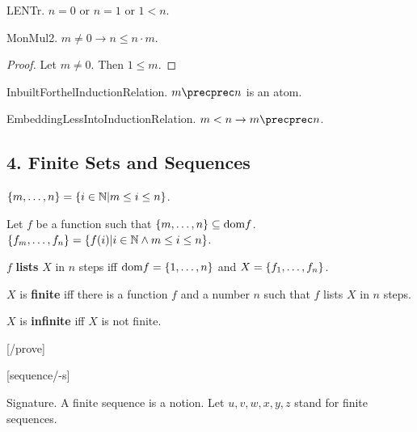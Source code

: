 \begin{axiom} LENTr. 
$n = 0$ or $n = 1$ or $1 < n$.\end{axiom}


\begin{lemma} MonMul2. $m \neq 0 \rightarrow n \leq n \cdot m$.
\end{lemma}
\begin{proof}
Let $m \neq 0$. Then $1 \leq m$.
\end{proof}

\begin{signature} InbuiltForthelInductionRelation. $m \precprec n$ is an atom.
\end{signature}

\begin{axiom} EmbeddingLessIntoInductionRelation. $m < n \rightarrow m \precprec n$. \end{axiom}

\subsection{4. Finite Sets and Sequences}

\begin{definitionp} 
$\{m,\dots,n\} = \{ i \in {\Bbb N} | m \leq i \leq n \}$.
\end{definitionp}

\begin{definitionp} 
Let $f$ be a function such that 
$\{m,\dots,n\} \subseteq \text{dom} f$. 
$\{f_{m},\dots,f_{n}\} = \{ f(i) | i \in {\Bbb N} \wedge m \leq i \leq n \}$.
\end{definitionp}

\begin{definitionp} $f$ {\bf lists} $X$ in $n$ steps iff 
$\text{dom} f = \{1,\dots,n\}$ and $X = \{f_{1},\dots,f_{n}\}$.
\end{definitionp}

\begin{definitionp} $X$ is {\bf finite} iff there is a function
$f$ and a number $n$ such that $f$ lists $X$ in $n$ steps.
\end{definitionp}

\begin{definitionp} $X$ is {\bf infinite} iff $X$ is not finite.
\end{definitionp}

[/prove]

[sequence/-s]

Signature. A finite sequence is a notion.
Let $u,v,w,x,y,z$ stand for finite sequences.

